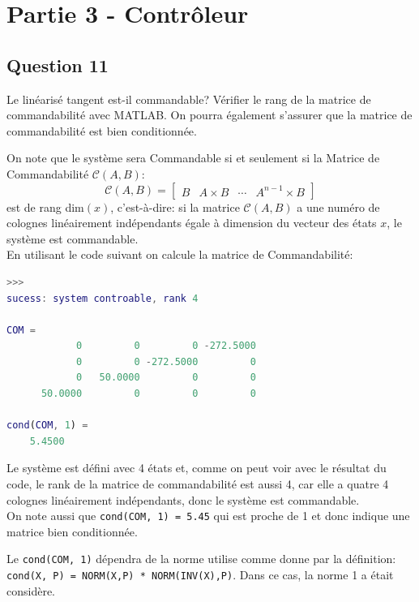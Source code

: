 \documentclass[class=article, crop=false]{standalone}
\begin{document}
\section{Partie 3 - Contrôleur}
\subsection{Question 11}
\begin{exercise}
    Le linéarisé tangent est-il commandable? Vérifier le rang de la matrice de commandabilité avec MATLAB. On pourra également s'assurer que la matrice de commandabilité est bien conditionnée.
\end{exercise}
\begin{resolution}
    On note que le système sera Commandable si et seulement si la Matrice de Commandabilité $\mathcal{C}(A, B)$:
    \begin{equation}
        \boxed{
            \mathcal{C}(A, B) = 
            \begin{bmatrix}
                B & A\times B & \cdots & A^{n-1}\times B
            \end{bmatrix}
        }
    \end{equation}
    est de rang dim$(x)$, c'est-à-dire: si la matrice $\mathcal{C}(A, B)$ a une numéro de colognes linéairement indépendants égale à dimension du vecteur des états $x$, le système est commandable.\\
    
    En utilisant le code suivant on calcule la matrice de Commandabilité:
    \begin{scriptsize}\mycode
        
    \end{scriptsize}
    \begin{scriptsize}\mycode
        \begin{lstlisting}[language=Matlab]
>>>
sucess: system controable, rank 4

COM =
            0         0         0 -272.5000
            0         0 -272.5000         0
            0   50.0000         0         0
      50.0000         0         0         0

cond(COM, 1) =
    5.4500
        \end{lstlisting}
    \end{scriptsize}
    Le système est défini avec 4 états et, comme on peut voir avec le résultat du code, le rank de la matrice de commandabilité est aussi 4, car elle a quatre 4 colognes linéairement indépendants, donc le système est commandable.\\

    On note aussi que \texttt{cond(COM, 1) = 5.45} qui est proche de 1 et donc indique une matrice bien conditionnée. 
    
    \begin{remark}
        Le \texttt{cond(COM, 1)} dépendra de la norme utilise comme donne par la définition: \texttt{cond(X, P) = NORM(X,P) * NORM(INV(X),P)}. Dans ce cas, la norme 1 a était considère.
    \end{remark}
\end{resolution}
\end{document}
